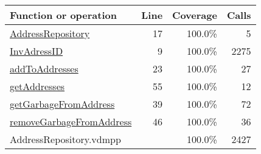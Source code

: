 \begin{longtable}{|l|r|r|r|}
\hline
Function or operation & Line & Coverage & Calls \\
\hline
\hline
\hyperref[AddressRepository:17]{AddressRepository} & 17&100.0\% & 5 \\
\hline
\hyperref[InvAdressID:9]{InvAdressID} & 9&100.0\% & 2275 \\
\hline
\hyperref[addToAddresses:23]{addToAddresses} & 23&100.0\% & 27 \\
\hline
\hyperref[getAddresses:55]{getAddresses} & 55&100.0\% & 12 \\
\hline
\hyperref[getGarbageFromAddress:39]{getGarbageFromAddress} & 39&100.0\% & 72 \\
\hline
\hyperref[removeGarbageFromAddress:46]{removeGarbageFromAddress} & 46&100.0\% & 36 \\
\hline
\hline
AddressRepository.vdmpp & & 100.0\% & 2427 \\
\hline
\end{longtable}

